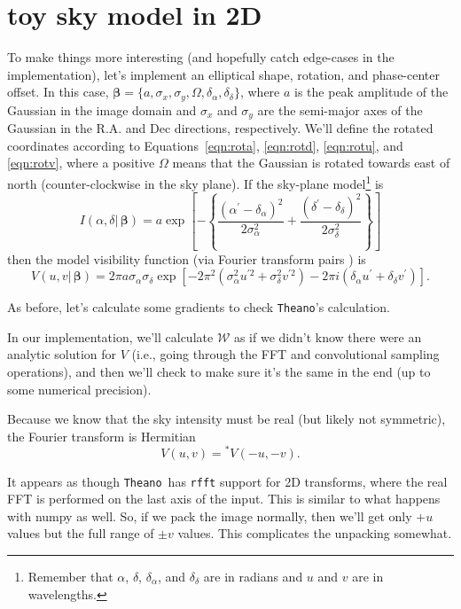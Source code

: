 \documentclass[modern]{aastex62}
\newcommand{\theano}{\texttt{Theano}}
\newcommand{\vm}{\boldsymbol{\mathcal{W}}} %
\newcommand{\bbeta}{\boldsymbol{\beta}} %
\begin{document}
\section{toy sky model in 2D}
To make things more interesting (and hopefully catch edge-cases in the implementation), let's implement an elliptical shape, rotation, and phase-center offset. In this case, $\bbeta = \{a, \sigma_x, \sigma_y, \Omega, \delta_\alpha, \delta_\delta \}$, where $a$ is the peak amplitude of the Gaussian in the image domain and $\sigma_x$ and $\sigma_y$ are the semi-major axes of the Gaussian in the R.A. and Dec directions, respectively. We'll define the rotated coordinates according to Equations~\ref{eqn:rota}, \ref{eqn:rotd}, \ref{eqn:rotu}, and \ref{eqn:rotv}, where a positive $\Omega$ means that the Gaussian is rotated towards east of north (counter-clockwise in the sky plane). If the sky-plane model\footnote{Remember that $\alpha$, $\delta$, $\delta_\alpha$, and $\delta_\delta$ are in radians and $u$ and $v$ are in wavelengths.} is
\begin{equation}
    I(\alpha, \delta |\, \bbeta) = a \exp \left [ - \left \{  \frac{(\alpha^\prime - \delta_\alpha)^2}{2 \sigma_\alpha^2} + \frac{(\delta^\prime - \delta_\delta)^2}{2 \sigma_\delta^2} \right \} \right ]
\end{equation}
then the model visibility function (via Fourier transform pairs \citep[e.g., ch. 16,][]{bracewell00}) is
\begin{equation}
    V(u, v |\, \bbeta) = 2 \pi a \sigma_\alpha \sigma_\delta \exp \left [ -2 \pi^2 (\sigma_\alpha^2 u^{\prime 2} + \sigma_\delta^2 v^{\prime 2}) - 2 \pi i (\delta_\alpha u^\prime + \delta_\delta v^\prime)\right ].
\end{equation}

As before, let's calculate some gradients to check \theano's calculation.

In our implementation, we'll calculate $\vm$ as if we didn't know there were an analytic solution for $V$ (i.e., going through the FFT and convolutional sampling operations), and then we'll check to make sure it's the same in the end (up to some numerical precision).

Because we know that the sky intensity must be real (but likely not symmetric), the Fourier transform is Hermitian
\begin{equation}
    V(u, v) = {}^*V(-u, -v).
\end{equation}

It appears as though \theano\ has \texttt{rfft} support for 2D transforms, where the real FFT is performed on the last axis of the input. This is similar to what happens with numpy as well. So, if we pack the image normally, then we'll get only $+u$ values but the full range of $\pm v$ values. This complicates the unpacking somewhat.
\end{document}
